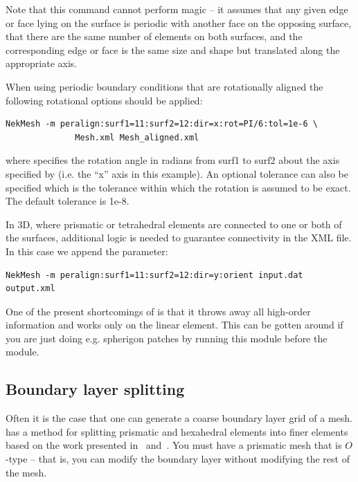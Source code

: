 Note that this command cannot perform magic -- it assumes that any given edge or
face lying on the surface is periodic with another face on the opposing surface,
that there are the same number of elements on both surfaces, and the
corresponding edge or face is the same size and shape but translated along the
appropriate axis.


When using periodic boundary conditions that are rotationally aligned the following rotational options should be applied:
%
\begin{lstlisting}[style=BashInputStyle]
NekMesh -m peralign:surf1=11:surf2=12:dir=x:rot=PI/6:tol=1e-6 \
              Mesh.xml Mesh_aligned.xml
\end{lstlisting}
%
where  specifies the rotation angle in radians from
surf1 to surf2 about the axis specified by  (i.e. the ``x'' axis in
this example). An optional tolerance \inltt{tol} can also be specified which is
the tolerance within which the rotation is assumed to be exact. The
default tolerance is 1e-8.

In 3D, where prismatic or tetrahedral elements are connected to one or both of
the surfaces, additional logic is needed to guarantee connectivity in the XML
file. In this case we append the \inltt{orient} parameter:
%
\begin{lstlisting}[style=BashInputStyle]
NekMesh -m peralign:surf1=11:surf2=12:dir=y:orient input.dat output.xml
\end{lstlisting}

\begin{notebox}
  One of the present shortcomings of  is that it throws away all
  high-order information and works only on the linear element. This can be
  gotten around if you are just doing e.g. spherigon patches by running this
  \inltt{peralign} module before the \inltt{spherigon} module.
\end{notebox}

\subsection{Boundary layer splitting}

Often it is the case that one can generate a coarse boundary layer grid of a
mesh. \nm has a method for splitting prismatic and hexahedral elements into
finer elements based on the work presented in~\cite{MoHaPeSh14}
and~\cite{MoHaPeSh14b}. You must have a prismatic mesh that is $O$-type -- that
is, you can modify the boundary layer without modifying the rest of the mesh.


